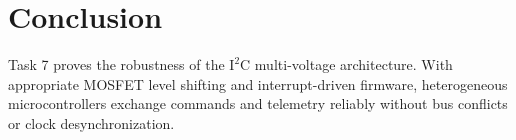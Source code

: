 \documentclass[11pt,a4paper]{article}
\begin{document}
\section{Conclusion}
Task 7 proves the robustness of the $\text{I}^2\text{C}$ multi-voltage architecture. With appropriate MOSFET level shifting and interrupt-driven firmware, heterogeneous microcontrollers exchange commands and telemetry reliably without bus conflicts or clock desynchronization.
\end{document}

